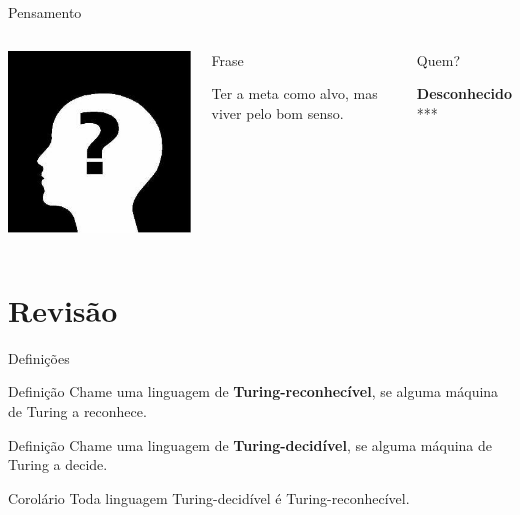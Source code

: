 \documentclass[xcolor=dvipsnames,table]{beamer}
\begin{document}
	\begin{frame}{Pensamento}
		\begin{columns}
		  		\begin{center}
		    		\includegraphics[height=.5\textheight]{images/desconhecido.jpg}
		  		\end{center}
				\begin{block}{Frase}
					\begin{center}
						{\large Ter a meta como alvo, mas viver pelo bom senso.}
					\end{center}
				\end{block}		  		
		  		\begin{block}{Quem?}
		  			\begin{center}
						{\bf Desconhecido} \\ ***
					\end{center}
				\end{block}
		\end{columns}
	\end{frame}
	
	\section{Revisão}
    
    \begin{frame}{Definições}
		\begin{block}{Definição}
			Chame uma linguagem de {\bf Turing-reconhecível}, se alguma máquina de Turing a reconhece.
		\end{block} 
		\begin{block}{Definição}
			Chame uma linguagem de {\bf Turing-decidível}, se alguma máquina de Turing a decide.
		\end{block}
		\begin{block}{Corolário}
			Toda linguagem Turing-decidível é Turing-reconhecível.
		\end{block}
	\end{frame}		
	
\end{document}
